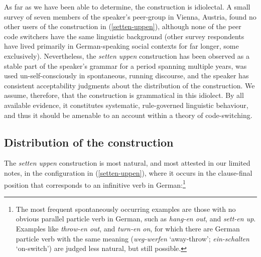 \documentclass[output=paper]{langscibook}
\begin{document}
As far as we have been able to determine, the construction is idiolectal. A small survey of seven members of the speaker's peer-group in Vienna, Austria, found no other users of the construction in (\ref{setten-uppen}), although none of the peer code switchers have the same linguistic background (other survey respondents have lived primarily in German-speaking social contexts for far longer, some exclusively). Nevertheless, the \textit{setten uppen} construction has been observed as a stable part of the speaker's grammar for a period spanning multiple years, was used un-self-consciously in spontaneous, running discourse, and the speaker has consistent acceptability judgments about the distribution of the construction. We assume, therefore, that the construction is grammatical in this idiolect. By all available evidence, it constitutes systematic, rule-governed linguistic behaviour, and thus it should be amenable to an account within a theory of code-switching. 

\subsection{Distribution of the construction}\largerpage

The \textit{setten uppen} construction is most natural, and most attested in our limited notes, in the configuration in (\ref{setten-uppen}), where it occurs in the clause-final position that corresponds to an infinitive verb in German:\footnote{The most frequent spontaneously occurring examples are those with no obvious parallel particle verb in German, such as \textit{hang-en out}, and \textit{sett-en up}. Examples like \textit{throw-en out}, and \textit{turn-en on}, for which there are German particle verb with the same meaning (\textit{weg-werfen} `away-throw'; \textit{ein-schalten} `on-switch') are judged less natural, but still possible.}

\ea\label{setten-uppen-2}
\z
\z 
\end{document}
